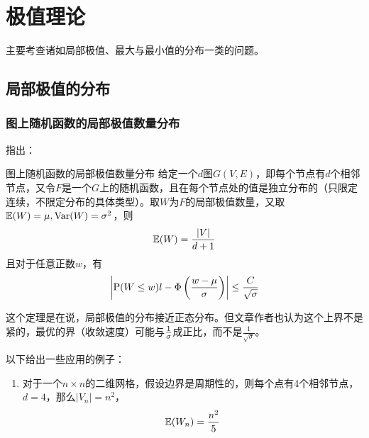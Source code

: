 \section{极值理论}
主要考查诸如局部极值、最大与最小值的分布一类的问题。
\subsection{局部极值的分布}

\subsubsection{图上随机函数的局部极值数量分布}
\cite{distribution-of-local-minima-of-graph}指出：
\begin{theorem}{图上随机函数的局部极值数量分布}
给定一个$d$图$G(V,E)$，即每个节点有$d$个相邻节点，又令$F$是一个$G$上的随机函数，且在每个节点处的值是独立分布的（只限定连续，不限定分布的具体类型）。取$W$为$F$的局部极值数量，又取$\operatorname{\mathbb{E}}(W)=\mu,\operatorname{Var} (W)=\sigma^2$，则
$$\operatorname{\mathbb{E}} (W)=\frac{|V|}{d+1}$$
且对于任意正数$w$，有
$$\left|\operatorname{P}(W\leq w)l-\Phi\left(\frac{w-\mu}{\sigma}\right)\right|\leq\frac{C}{\sqrt{\sigma}}$$
\end{theorem}

这个定理是在说，局部极值的分布接近正态分布。但文章作者也认为这个上界不是紧的，最优的界（收敛速度）可能与$\frac{1}{\sigma}$成正比，而不是$\frac{1}{\sqrt{\sigma}}$。

以下给出一些应用的例子：
\begin{enumerate}
	\item 对于一个$n\times n$的二维网格，假设边界是周期性的，则每个点有4个相邻节点，$d=4$，那么$|V_n|=n^2$，
	$$\operatorname{\mathbb{E}}(W_n)=\frac{n^2}{5}$$
	
\end{enumerate}